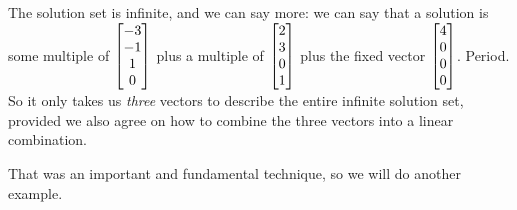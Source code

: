 \documentclass{ximera}
\begin{document}
\begin{example}
\begin{question}
      \begin{feedback}[correct]
        The solution set is infinite, and we can say more: we can say
        that a solution is some multiple of $\begin{bmatrix}-3\\-1\\1\\0\end{bmatrix}$
        plus a multiple of $\begin{bmatrix}2\\3\\0\\1\end{bmatrix}$ plus the fixed
        vector $\begin{bmatrix}4\\0\\0\\0\end{bmatrix}$.  Period.  So it only takes us
        \textit{three} vectors to describe the entire infinite
        solution set, provided we also agree on how to combine the
        three vectors into a linear combination.
      \end{feedback}
    \end{question}
  \end{example}

That was an important and fundamental technique, so we will do another
example.
\end{document}
